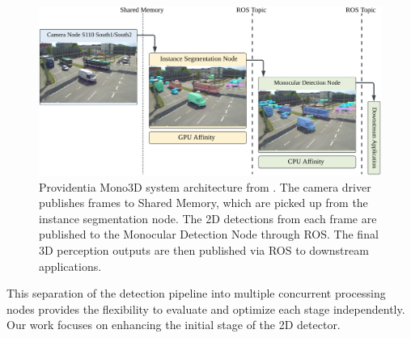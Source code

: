 \begin{figure}[htb]%
	\centering%
	\includegraphics[width=150mm]{figures/mono3D-architecture.png}%
	\caption{Providentia Mono3D system architecture from \cite{thesisJoseph}. The camera driver publishes frames to Shared Memory, which are picked up from the instance segmentation node. The 2D detections from each frame are published to the Monocular Detection Node through ROS. The final 3D perception outputs are then published via ROS to downstream applications.}%
	\label{mono3D architecture}%
\end{figure}%


This separation of the detection pipeline into multiple concurrent processing nodes provides the flexibility to evaluate and optimize each stage independently. Our work focuses on enhancing the initial stage of the 2D detector. 



